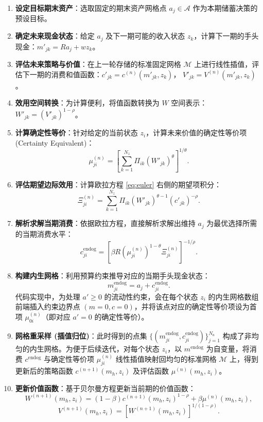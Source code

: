 \documentclass[UTF8,a4paper,12pt]{ctexart}
\newcommand{\R}{R}
\newcommand{\Agrid}{\mathcal{A}}
\newcommand{\Mgrid}{\mathcal{M}}
\begin{document}
\begin{enumerate}
    \item \textbf{设定目标期末资产}：选取固定的期末资产网格点 $a_j\in\Agrid$ 作为本期储蓄决策的预设目标。
    \item \textbf{确定未来现金状态}：给定 $a_j$ 及下一期可能的收入状态 $z_k$，计算下一期的手头现金：$m'_{jk}=\R a_j+wz_k$。
    \item \textbf{评估未来策略与价值}：在上一轮存储的标准固定网格 $\Mgrid$ 上进行线性插值，评估下一期的消费和值函数：$c'_{jk}=c^{(n)}(m'_{jk},z_k)$， $V'_{jk}=V^{(n)}(m'_{jk},z_k)$。
    \item \textbf{效用空间转换}：为计算便利，将值函数转换为 $W$ 空间表示：$W'_{jk}=(V'_{jk})^{1-\rho}$。
    \item \textbf{计算确定性等价}：针对给定的当前状态 $z_i$，计算未来价值的确定性等价项 (Certainty Equivalent)：
    \[
        \mu^{(n)}_{ji} = \left[ \sum_{k=1}^{N_z} \Pi_{ik}(W'_{jk})^\theta \right]^{1/\theta}.
    \]
    \item \textbf{评估期望边际效用}：计算欧拉方程 \eqref{eq:euler} 右侧的期望项积分：
    \[
        \Xi^{(n)}_{ji} = \sum_{k=1}^{N_z} \Pi_{ik} (W'_{jk})^{\theta-1} (c'_{jk})^{-\rho}.
    \]
    \item \textbf{解析求解当期消费}：依据欧拉方程，直接解析求解出维持 $a_j$ 为最优选择所需的当期消费水平：
    \[
        c^{\mathrm{endog}}_{ji} = \left[ \beta\R \left(\mu^{(n)}_{ji}\right)^{1-\theta} \Xi^{(n)}_{ji} \right]^{-1/\rho}.
    \]
    \item \textbf{构建内生网格}：利用预算约束推导对应的当期手头现金状态：
    \[
        m^{\mathrm{endog}}_{ji} = a_j+c^{\mathrm{endog}}_{ji}.
    \]
    代码实现中，为处理 $a' \ge 0$ 的流动性约束，会在每个状态 $z_i$ 的内生网格数组前端插入约束边界点 $(m=0, c=0)$，并将该点对应的确定性等价项设为首项 $\mu^{(n)}_{0i}$（即对应 $a'=0$ 的确定性等价）。
    \item \textbf{网格重采样 (插值归位)}：此时得到的点集 $\{(m^{\mathrm{endog}}_{ji},c^{\mathrm{endog}}_{ji})\}_{j=1}^{N_a}$ 构成了非均匀的内生网格。为便于后续迭代，对每个状态 $z_i$，以 $m^{\mathrm{endog}}$ 为自变量，将消费 $c^{\mathrm{endog}}$ 与确定性等价项 $\mu^{(n)}_{ji}$ 线性插值映射回均匀的标准网格 $\Mgrid$ 上，得到更新后的策略函数 $c^{(n+1)}(m_h,z_i)$ 及评估函数 $\mu^{(n)}(m_h,z_i)$。
    \item \textbf{更新价值函数}：基于贝尔曼方程更新当前期的价值函数：
    \[
        W^{(n+1)}(m_h,z_i) = (1-\beta)c^{(n+1)}(m_h,z_i)^{1-\rho} + \beta\mu^{(n)}(m_h,z_i),
    \]
    \[
        V^{(n+1)}(m_h,z_i) = \left[W^{(n+1)}(m_h,z_i)\right]^{1/(1-\rho)}.
    \]
\end{enumerate}
\end{document}
